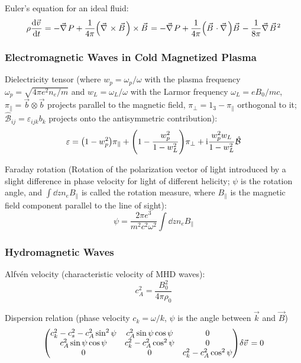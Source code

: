 			\noindent
			Euler's equation for an ideal fluid:
			\begin{equation}
				\rho \dv{\vec{v}}{t} = - \Nabla P + \frac{1}{4\pi}\qty(\Nabla\times\vec{B})\times\vec{B}
				= - \Nabla P + \frac{1}{4\pi} \qty(\vec{B} \cdot \Nabla) \vec{B} - \frac{1}{8\pi} \Nabla \vec{B}^2
			\end{equation}

		\subsubsection{Electromagnetic Waves in Cold Magnetized Plasma}
			Dielectricity tensor (where $w_p = \omega_p / \omega$ with the plasma frequency $\omega_p = \sqrt{4\pi e^2 n_e/m}$ and $w_L = \omega_L / \omega$ with the Larmor frequency $\omega_L = e B_0/mc$, $\pi_\parallel = \vec{b}\otimes\vec{b}$ projects parallel to the magnetic field, $\pi_\perp = 1_3 - \pi_\parallel$ orthogonal to it; $\hat{\mathcal{B}}_{ij} = \varepsilon_{ijk} b_k$ projects onto the antisymmetric contribution):
			\begin{equation}
				\varepsilon = \qty(1 - w_p^2) \pi_\parallel + \qty(1-\frac{w_p^2}{1-w_L^2})\pi_\perp + \mathrm{i} \frac{w_p^2 w_L}{1-w_L^2} \hat{\mathcal{B}}
			\end{equation}

			\noindent
			Faraday rotation (Rotation of the polarization vector of light introduced by a slight difference in phase velocity for light of different helicity; $\psi$ is the rotation angle, and $\int \dd{z} n_e B_\parallel$ is called the rotation measure, where $B_\parallel$ is the magnetic field component parallel to the line of sight):
			\begin{equation}
				\psi = \frac{2\pi e^3}{m^2 c^2 \omega^2} \int \dd{z} n_e B_\parallel
			\end{equation}

		\subsubsection{Hydromagnetic Waves}
			Alfvén velocity (characteristic velocity of MHD waves):
			\begin{equation}
				c_A^2 = \frac{B_0^2}{4\pi \rho_0}
			\end{equation}

			\noindent
			Dispersion relation (phase velocity $c_k = \omega/k$, $\psi$ is the angle between $\vec{k}$ and $\vec{B}$)
			\begin{equation}
				\mqty(
				c_k^2 - c_s^2 - c_A^2 \sin^2 \psi & c_A^2 \sin\psi \cos\psi & 0 \\
				c_A^2 \sin\psi \cos\psi & c_k^2 - c_A^2 \cos^2 \psi & 0 \\
				0 & 0 & c_k^2 - c_A^2 \cos^2 \psi
				) \delta \vec{v} = 0
			\end{equation}

